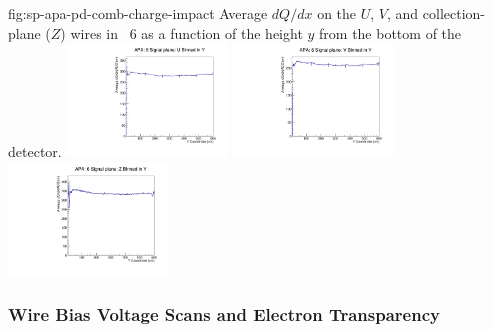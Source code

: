 \begin{dunefigure}{fig:sp-apa-pd-comb-charge-impact}
{Average $dQ/dx$ on the $U$, $V$, and collection-plane ($Z$) wires in ~6 as a function of the height $y$ from the bottom of the  detector. }
\includegraphics[width=0.32\textwidth]{graphics/sp-apa-comb-apa6sUbY.pdf}
\includegraphics[width=0.32\textwidth]{graphics/sp-apa-comb-apa6sVbY.pdf}
\includegraphics[width=0.32\textwidth]{graphics/sp-apa-comb-apa6sZbY.pdf}   
\end{dunefigure}

\subsubsection{Wire Bias Voltage Scans and Electron Transparency}
\label{sec:fdsp-apa-qa-protodune-ops-bias-scans}


